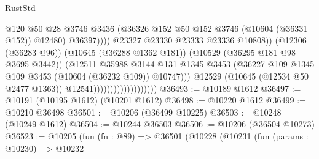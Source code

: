 \begin{lexlean}{RustStd}
\begin{coremodule}
                                                        @120
                                                        @50
                                                        @28
                                                        @3746
                                                        @3436
                                                        (@36326
                                                          @152
                                                          @50
                                                          @152
                                                          @3746
                                                          (@10604 (@36331 @152))
                                                          @12480)
                                                        @36397))))
                                                @23327
                                                @23330
                                                @23333
                                                @23336
                                                @10808))
                                            (@12306 (@36283 @96))
                                            (@10645 (@36288 @1362 @181))
                                            (@10529 (@36295 @181 @98 @3695 @3442))
                                            (@12511
                                              @35988
                                              @3144
                                              @131
                                              @1345
                                              @3453
                                              (@36227
                                                @109
                                                @1345
                                                @109
                                                @3453
                                                (@10604 (@36232 @109))
                                                @10747)))
                                          @12529
                                          (@10645 (@12534 @50 @2477 @1363))
                                          @12541)))))))))))))))))))
@36493 := @10189 @1612
@36497 := @10191 (@10195 @1612) (@10201 @1612)
@36498 := @10220 @1612
@36499 := @10210 @36498
@36501 := @10206 (@36499 @10225)
@36503 := @10248 (@10249 @1612)
@36504 := @10244 @36503
@36506 := @10206 (@36504 @10273)
@36523 := @10205
    (fun (fn : @89) =>
    @36501
      (@10228
        (@10231
          (fun (params : @10230) =>
          @10232

\end{coremodule}
\end{lexlean}
